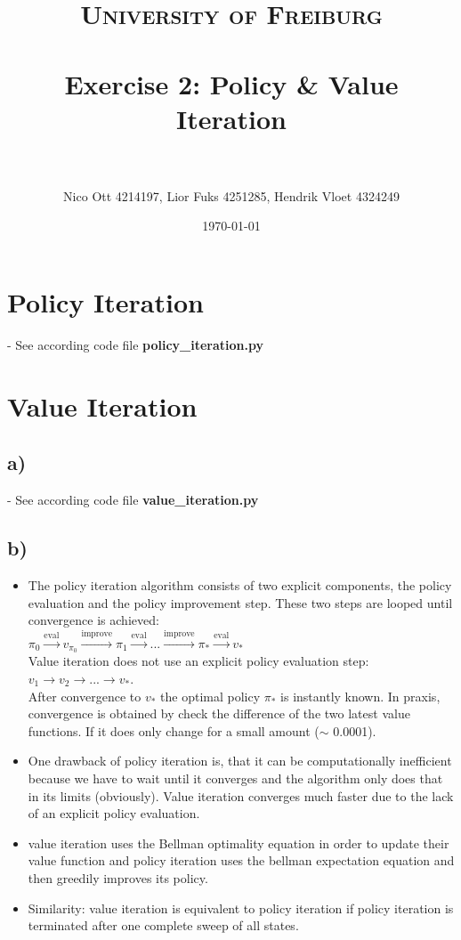 \documentclass[paper=a4, fontsize=10pt]{scrartcl} %
\title{	
\normalfont \normalsize 
\textsc{University of Freiburg} \\ [25pt] %
\horrule{0.5pt} \\[0.4cm] %
\huge Exercise 2: Policy \& Value Iteration \\ %
\horrule{2pt} \\[0.5cm] %
}
\author{Nico Ott 4214197, Lior Fuks 4251285, Hendrik Vloet 4324249}
\date{\normalsize\today} %
\numberwithin{equation}{section} %
\numberwithin{figure}{section} %
\numberwithin{table}{section} %
\begin{document}
\maketitle %

\section{Policy Iteration}
- See according code file \textbf{policy\_iteration.py}


\section{Value Iteration}
\subsection*{a)}
- See according code file \textbf{value\_iteration.py}
\subsection*{b)}
\begin{itemize}

\item The policy iteration algorithm consists of two explicit components, the policy evaluation and the policy improvement step. These two steps are looped until convergence is achieved:\\
$ \pi_0 \xrightarrow{\text{eval}} v_{\pi_0} \xrightarrow{\text{improve}} \pi_1 \xrightarrow{\text{eval}} ... \xrightarrow{\text{improve}} \pi_* \xrightarrow{\text{eval}} v_* $ \\
Value iteration does not use an explicit policy evaluation step: $v_1 \rightarrow v_2 \rightarrow ...  \rightarrow v_*$.\\
 After convergence to $v_*$ the optimal policy $\pi_*$ is instantly known.
In praxis, convergence is obtained by check the difference of the two latest value functions. If it does only change for a small amount ($\sim$ 0.0001). 
\item One drawback of policy iteration is, that it can be computationally inefficient because we have to wait until it converges and the algorithm only does that in its limits (obviously). Value iteration converges much faster due to the lack of an explicit policy evaluation.

\item value iteration uses the Bellman optimality equation in order to update their value function and policy iteration uses the bellman expectation equation and then greedily improves its policy. 
\item Similarity: value iteration is equivalent to policy iteration if policy iteration is terminated after one complete sweep of all states.\\
\end{itemize}
\clearpage
\end{document}
